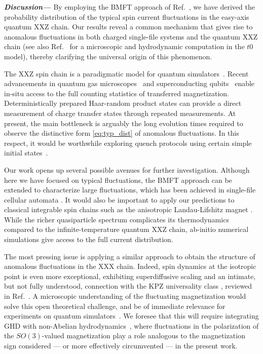 \documentclass[
twocolumn,
amsfonts,
showpacs,
superscriptaddress,
amsmath,
amssymb,
aps,
longbibliography,
prl,
noeprint
]{revtex4-2}
\newcommand{\ch}[1]{{\color{black}  #1}}
\newcommand{\para}[1]{ \noindent\emph{\textbf{#1---}}}
\newcounter{ls}
\newcommand{\1}{{\bf 1}}
\begin{document}
\para{Discussion}
By employing the BMFT approach of Ref.~\cite{Yoshimura2025}, we have derived the probability distribution of the typical spin current fluctuations in the easy-axis quantum XXZ chain. Our results reveal a common mechanism that gives rise to anomalous fluctuations in both charged single-file systems and the quantum XXZ chain (see also Ref.~\cite{Fujimoto2026} for a microscopic and hydrodynamic computation in the $t0$ model), thereby clarifying the universal origin of this phenomenon.

\ch{The XXZ spin chain is a paradigmatic model for quantum simulators~\cite{Jepsen2020,wei2022,Rosenberg_2024}. Recent advancements in quantum gas microscopes~\cite{wei2022} and superconducting qubits~\cite{Rosenberg_2024} enable in-situ access to the full counting statistics of transferred magnetization.}
\ch{Deterministically prepared Haar-random product states can provide a direct measurement of charge transfer states through repeated measurements. At present, the main bottleneck is arguably the long evolution times required to observe the distinctive form \eqref{eq:typ_dist} of anomalous fluctuations. In this respect, it would be worthwhile exploring quench protocols using certain simple initial states~\cite{Pozsgay2014,Piroli2017Quench}.}

Our work opens up several possible avenues for further investigation. Although here we have focused on typical fluctuations, the BMFT approach can be extended to characterize large fluctuations, which has been achieved in single-file cellular automata \cite{Yoshimura2025}.
It would also be important to apply our predictions to classical integrable spin chains such as the anisotropic Landau-Lifshitz magnet \cite{bastianello2024landaulifschitz}. While the richer quasiparticle spectrum complicates its thermodynamics compared to the infinite-temperature quantum XXZ chain, ab-initio numerical simulations give access to the full current distribution.


\ch{The most pressing issue is applying a similar approach to obtain the structure of anomalous fluctuations in the XXX chain.}
Indeed, spin dynamics at the isotropic point is even more exceptional, exhibiting superdiffusive scaling and an intimate, but not fully understood, connection with the KPZ universality class \cite{Ljubotina2019a,Das2019,Krajnik2020,Weiner2019,Dupont2020,Krajnik2020a,superuniversality,takeuchi2024,muzzi2025}, reviewed in Ref.~\cite{superdiffusion_review}. A microscopic understanding of the fluctuating magnetization would solve this open theoretical challenge, and be of immediate relevance for experiments on quantum simulators~\cite{Scheie2021,wei2022,Rosenberg_2024}.
We foresee that this will require integrating GHD with non-Abelian hydrodynamics~\cite{Lucas2021}, where fluctuations in the polarization of the $SO(3)$-valued magnetization play a role analogous to the magnetization sign considered — or more effectively circumvented — in the present work.
\end{document}
